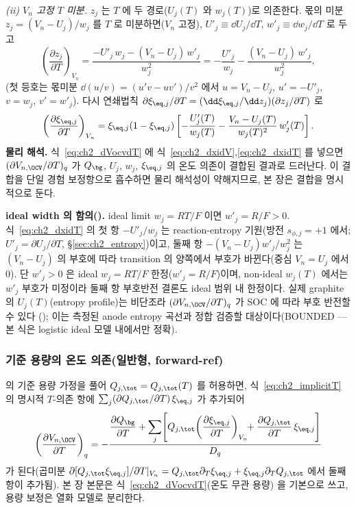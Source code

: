 \emph{(ii) $V_n$ 고정 $T$ 미분.} $z_j$ 는 $T$ 에 두 경로($U_j(T)$ 와 $w_j(T)$)로 의존한다. 몫의 미분
$z_j=(V_n-U_j)/w_j$ 를 $T$ 로 미분하면($V_n$ 고정), $U'_j\equiv\dd U_j/\dd T$, $w'_j\equiv\dd w_j/\dd T$ 로
두고
\begin{equation}
\left(\frac{\partial z_j}{\partial T}\right)_{V_n}=\frac{-U'_j\,w_j-(V_n-U_j)\,w'_j}{w_j^2}
=-\frac{U'_j}{w_j}-\frac{(V_n-U_j)\,w'_j}{w_j^2},
\label{eq:ch2_dzdT}
\end{equation}
(첫 등호는 몫미분 $\dd(u/v)=(u'v-uv')/v^2$ 에서 $u=V_n-U_j$, $u'=-U'_j$, $v=w_j$, $v'=w'_j$). 다시 연쇄법칙
$\partial\xi_{\eq,j}/\partial T=(\dd\xi_{\eq,j}/\dd z_j)(\partial z_j/\partial T)$ 로
\begin{equation}
\left(\frac{\partial\xi_{\eq,j}}{\partial T}\right)_{V_n}
=\xi_{\eq,j}(1-\xi_{\eq,j})\left[-\frac{U'_j(T)}{w_j(T)}-\frac{V_n-U_j(T)}{w_j(T)^2}\,w'_j(T)\right].
\label{eq:ch2_dxidT}
\end{equation}
\textbf{물리 해석.} 식~\eqref{eq:ch2_dVocvdT} 에 식~\eqref{eq:ch2_dxidV},\eqref{eq:ch2_dxidT} 를 넣으면
$(\partial V_{n,\OCV}/\partial T)_q$ 가 $Q_\bg$, $U_j$, $w_j$, $\xi_{\eq,j}$ 의 온도 의존이 결합된 결과로
드러난다. 이 결합을 단일 경험 보정항으로 흡수하면 물리 해석성이 약해지므로, 본 장은 결합을 명시적으로 둔다.
\begin{boundbox}
\textbf{ideal width 의 함의().} ideal limit $w_j=RT/F$ 이면 $w'_j=R/F>0$. 식~\eqref{eq:ch2_dxidT} 의
첫 항 $-U'_j/w_j$ 는 reaction-entropy 기원(방전 $s_{\phi,j}=+1$ 에서; $U'_j=\partial U_j/\partial T$, \S\ref{sec:ch2_entropy})이고, 둘째
항 $-(V_n-U_j)w'_j/w_j^2$ 는 $(V_n-U_j)$ 의 부호에 따라 transition 의 양쪽에서 부호가 바뀐다(중심 $V_n=U_j$
에서 $0$). 단 $w'_j>0$ 은 ideal $w_j=RT/F$ 한정($w'_j=R/F$)이며, non-ideal $w_j(T)$ 에서는 $w'_j$ 부호가
미정이라 둘째 항 부호반전 결론도 ideal 범위 내 한정이다. 실제 graphite 의 $U_j(T)$(entropy profile)는 비단조라 $(\partial V_{n,\OCV}/\partial T)_q$ 가
SOC 에 따라 부호 반전할 수 있다 \cite{reynier2004,thomasnewman2003}(); 이는 측정된 anode entropy
곡선과 정합 검증할 대상이다(BOUNDED — 본 식은 logistic ideal 모델 내에서만 정확).
\end{boundbox}

\subsubsection{기준 용량의 온도 의존(일반형, forward-ref)}\label{sec:ch2_ocvT_general}
 의 기준 용량 가정을 풀어 $Q_{j,\tot}=Q_{j,\tot}(T)$ 를 허용하면, 식~\eqref{eq:ch2_implicitT} 의 명시적
$T$-의존 항에 $\sum_j(\partial Q_{j,\tot}/\partial T)\,\xi_{\eq,j}$ 가 추가되어
\begin{equation}
\left(\frac{\partial V_{n,\OCV}}{\partial T}\right)_q
=-\frac{\dfrac{\partial Q_\bg}{\partial T}+\displaystyle\sum_j\!\left[Q_{j,\tot}\!\left(\dfrac{\partial\xi_{\eq,j}}{\partial T}\right)_{V_n}\!\!+\dfrac{\partial Q_{j,\tot}}{\partial T}\,\xi_{\eq,j}\right]}{D_q}
\label{eq:ch2_dVocvdT_gen}
\end{equation}
가 된다(곱미분 $\partial[Q_{j,\tot}\xi_{\eq,j}]/\partial T|_{V_n}=Q_{j,\tot}\partial_T\xi_{\eq,j}+\xi_{\eq,j}\partial_T Q_{j,\tot}$
에서 둘째 항이 추가됨). 본 장 본문은 식~\eqref{eq:ch2_dVocvdT}(온도 무관 용량) 을 기본으로 쓰고, 용량 보정은
열화 모델로 분리한다.

